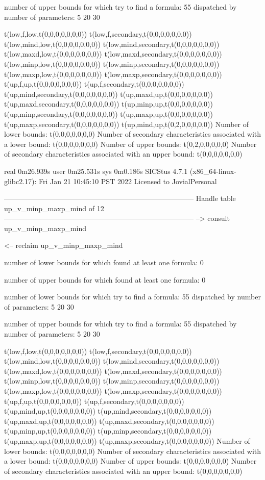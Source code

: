 number of upper bounds for which try to find a formula: 55
dispatched by number of parameters: 5  20  30

t(low,f,low,t(0,0,0,0,0,0,0))
t(low,f,secondary,t(0,0,0,0,0,0,0))
t(low,mind,low,t(0,0,0,0,0,0,0))
t(low,mind,secondary,t(0,0,0,0,0,0,0))
t(low,maxd,low,t(0,0,0,0,0,0,0))
t(low,maxd,secondary,t(0,0,0,0,0,0,0))
t(low,minp,low,t(0,0,0,0,0,0,0))
t(low,minp,secondary,t(0,0,0,0,0,0,0))
t(low,maxp,low,t(0,0,0,0,0,0,0))
t(low,maxp,secondary,t(0,0,0,0,0,0,0))
t(up,f,up,t(0,0,0,0,0,0,0))
t(up,f,secondary,t(0,0,0,0,0,0,0))
t(up,mind,secondary,t(0,0,0,0,0,0,0))
t(up,maxd,up,t(0,0,0,0,0,0,0))
t(up,maxd,secondary,t(0,0,0,0,0,0,0))
t(up,minp,up,t(0,0,0,0,0,0,0))
t(up,minp,secondary,t(0,0,0,0,0,0,0))
t(up,maxp,up,t(0,0,0,0,0,0,0))
t(up,maxp,secondary,t(0,0,0,0,0,0,0))
t(up,mind,up,t(0,2,0,0,0,0,0))
Number of lower bounds:                                             t(0,0,0,0,0,0,0)
Number of secondary characteristics associated with a lower bound:  t(0,0,0,0,0,0,0)
Number of upper bounds:                                             t(0,2,0,0,0,0,0)
Number of secondary characteristics associated with an upper bound: t(0,0,0,0,0,0,0)

real	0m26.939s
user	0m25.531s
sys	0m0.186s
SICStus 4.7.1 (x86_64-linux-glibc2.17): Fri Jan 21 10:45:10 PST 2022
Licensed to JovialPersonal


--------------------------------------------------------------------------------
Handle table up_v_minp_maxp_mind of 12
--------------------------------------------------------------------------------
--> consult up_v_minp_maxp_mind

<-- reclaim up_v_minp_maxp_mind

number of lower bounds for which found at least one formula: 0

number of upper bounds for which found at least one formula: 0

number of lower bounds for which try to find a formula: 55
dispatched by number of parameters: 5  20  30

number of upper bounds for which try to find a formula: 55
dispatched by number of parameters: 5  20  30

t(low,f,low,t(0,0,0,0,0,0,0))
t(low,f,secondary,t(0,0,0,0,0,0,0))
t(low,mind,low,t(0,0,0,0,0,0,0))
t(low,mind,secondary,t(0,0,0,0,0,0,0))
t(low,maxd,low,t(0,0,0,0,0,0,0))
t(low,maxd,secondary,t(0,0,0,0,0,0,0))
t(low,minp,low,t(0,0,0,0,0,0,0))
t(low,minp,secondary,t(0,0,0,0,0,0,0))
t(low,maxp,low,t(0,0,0,0,0,0,0))
t(low,maxp,secondary,t(0,0,0,0,0,0,0))
t(up,f,up,t(0,0,0,0,0,0,0))
t(up,f,secondary,t(0,0,0,0,0,0,0))
t(up,mind,up,t(0,0,0,0,0,0,0))
t(up,mind,secondary,t(0,0,0,0,0,0,0))
t(up,maxd,up,t(0,0,0,0,0,0,0))
t(up,maxd,secondary,t(0,0,0,0,0,0,0))
t(up,minp,up,t(0,0,0,0,0,0,0))
t(up,minp,secondary,t(0,0,0,0,0,0,0))
t(up,maxp,up,t(0,0,0,0,0,0,0))
t(up,maxp,secondary,t(0,0,0,0,0,0,0))
Number of lower bounds:                                             t(0,0,0,0,0,0,0)
Number of secondary characteristics associated with a lower bound:  t(0,0,0,0,0,0,0)
Number of upper bounds:                                             t(0,0,0,0,0,0,0)
Number of secondary characteristics associated with an upper bound: t(0,0,0,0,0,0,0)

